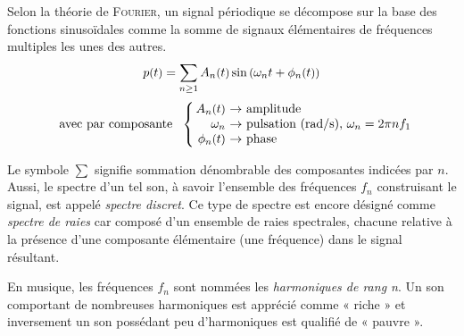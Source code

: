 
Selon la théorie de \textsc{Fourier}, un signal périodique se décompose sur la base des fonctions sinusoïdales comme la somme de signaux élémentaires de fréquences multiples les unes des autres.
\begin{equation}
p\mbox{\small (} t \mbox{\small )} = \sum_{n \geq 1} A_{n}\mbox{\small (} t \mbox{\small )}
\sin\mbox{\small (} \omega_{n}t + \phi_{n}\mbox{\small (} t \mbox{\small )} \mbox{\small )}
\label{eq:V.5}
\end{equation}
\[
~~\mbox{avec par composante~~}\left \{ \begin{tabular}[c]{@{\,}r@{~}l@{}}
$A_{n}\var{t}$ $\rightarrow$ & amplitude\\
$\omega_{n}$ $\rightarrow$ & pulsation (rad/s), $\omega_{n} = 2\pi n f_{1}$ \\
$\phi_{n}\var{t}$ $\rightarrow$ & phase
\end{tabular}\right.
\]

Le symbole $\sum$ signifie sommation dénombrable des composantes indicées par $n$. Aussi, le spectre d'un tel son, à savoir l'ensemble des fréquences $f_n$ construisant le signal, est appelé \emph{spectre discret}. Ce type de spectre est encore désigné comme \emph{spectre de raies} car composé d'un ensemble de raies spectrales, chacune relative à la présence d'une composante élémentaire (une fréquence) dans le signal résultant.

En musique, les fréquences $f_n$ sont nommées les \emph{harmoniques de rang n}. Un son comportant de nombreuses harmoniques est apprécié comme « riche » et inversement un son possédant peu d'harmoniques est qualifié de « pauvre ».


